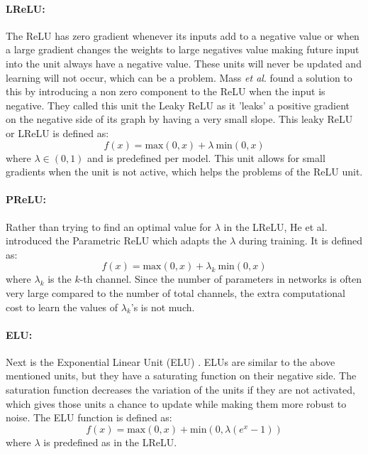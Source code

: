 \paragraph{LReLU:}
The ReLU has zero gradient whenever its inputs add to a negative value or when a large gradient changes the weights to large negatives value making future input into the unit always have a negative value. These units will never be updated and learning will not occur, which can be a problem. Mass \textit{et al}. \cite{maas2013rectifier} found a solution to this by introducing a non zero component to the ReLU when the input is negative. They called this unit the Leaky ReLU as it 'leaks' a positive gradient on the negative side of its graph by having a very small slope. This leaky ReLU or LReLU is defined as:
\begin{equation}
f(x) = \mbox{max}(0,x) + \lambda ~\mbox{min}(0,x)
\label{e:lrelu}
\end{equation}
where $\lambda \in (0,1)$ and is predefined per model. This unit allows for small gradients when the unit is not active, which helps the problems of the ReLU unit.

\paragraph{PReLU:}
Rather than trying to find an optimal value for $\lambda$ in the LReLU, He et al. \cite{he2015delving} introduced the Parametric ReLU which adapts the $\lambda$ during training. It is defined as:
\begin{equation}
f(x) = \mbox{max}(0,x) + \lambda_k ~\mbox{min}(0,x)
\label{e:prelu}
\end{equation}
where $\lambda_k$ is the $k$-th channel. Since the number of parameters in networks is often very large compared to the number of total channels, the extra computational cost to learn the values of $\lambda_k$'s is not much.

\paragraph{ELU:}
Next is the Exponential Linear Unit (ELU) \cite{clevert2015fast}. ELUs are similar to the above mentioned units, but they have a saturating function on their negative side. The saturation function decreases the variation of the units if they are not activated, which gives those units a chance to update while making them more robust to noise. The ELU function is defined as:
\begin{equation}
f(x) = \mbox{max}(0,x) + \mbox{min}(0,\lambda(e^{x}-1))
\label{e:elu}
\end{equation}
where $\lambda$ is predefined as in the LReLU.


